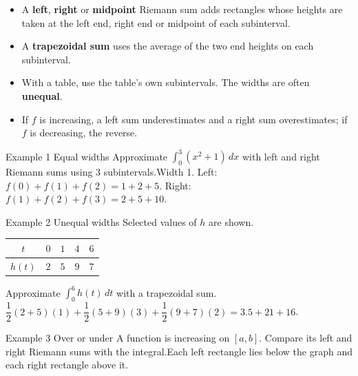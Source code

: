 \documentclass[11pt]{article}
\begin{document}

\begin{ideabox}
\begin{itemize}[leftmargin=*,itemsep=2pt,topsep=2pt]
  \item A \textbf{left}, \textbf{right} or \textbf{midpoint} Riemann sum adds rectangles whose heights are taken at the left end, right end or midpoint of each subinterval.
  \item A \textbf{trapezoidal sum} uses the average of the two end heights on each subinterval.
  \item With a table, use the table's own subintervals. The widths are often \textbf{unequal}.
  \item If $f$ is increasing, a left sum underestimates and a right sum overestimates; if $f$ is decreasing, the reverse.
\end{itemize}
\end{ideabox}

\begin{example}{Example 1 \textperiodcentered{} Equal widths}
Approximate $\displaystyle\int_{0}^{3}\left(x^2+1\right)\,dx$ with left and right Riemann sums using 3 subintervals.\soln Width 1. Left: $f(0)+f(1)+f(2)=1+2+5$. Right: $f(1)+f(2)+f(3)=2+5+10$.
\end{example}

\begin{example}{Example 2 \textperiodcentered{} Unequal widths}
Selected values of $h$ are shown.\begin{center}\renewcommand{\arraystretch}{1.25}\begin{tabular}{|c|c|c|c|c|}\hline $t$ & $0$ & $1$ & $4$ & $6$ \\ \hline $h(t)$ & $2$ & $5$ & $9$ & $7$ \\ \hline\end{tabular}\end{center}Approximate $\displaystyle\int_{0}^{6}h(t)\,dt$ with a trapezoidal sum.\soln $\dfrac12(2+5)(1)+\dfrac12(5+9)(3)+\dfrac12(9+7)(2)=3.5+21+16$.
\end{example}

\begin{example}{Example 3 \textperiodcentered{} Over or under}
A function is increasing on $[a,b]$. Compare its left and right Riemann sums with the integral.\soln Each left rectangle lies below the graph and each right rectangle above it.
\end{example}
\end{document}
